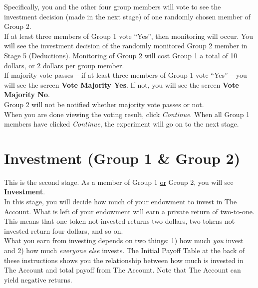 \documentclass[12pt]{article}
\begin{document}
Specifically, you and the other four group members will vote to see the investment decision (made in the next stage) of one randomly chosen member of Group 2.\\ 
 
If at least three members of Group 1 vote ``Yes'', then monitoring will occur.  You will see the investment decision of the randomly monitored Group 2 member in Stage 5 (Deductions).  Monitoring of Group 2 will cost Group 1 a total of 10 dollars, or 2 dollars per group member.\\ 
 
If majority vote passes -- if at least three members of Group 1 vote ``Yes'' -- you will see the screen {\bf Vote Majority Yes}.  If not, you will see the screen {\bf Vote Majority No}.\\ 

Group 2 will not be notified whether majority vote passes or not.\\ 

When you are done viewing the voting result, click {\em Continue}. When all Group 1 members have clicked {\em Continue}, the experiment will go on to the next stage.\\ 

\newpage

\fi




\section{Investment (Group 1 \& Group 2)}

This is the second stage. As a member of Group 1 \underline{or} Group 2, you will see {\bf Investment}.\\

In this stage, you will decide how much of your endowment to invest in The Account. What is left of your endowment will earn a private return of two-to-one. This means that one token not invested returns two dollars, two tokens not invested return four dollars, and so on.\\ 

What you earn from investing depends on two things: 1) how much {\em you} invest and 2) how much {\em everyone else} invests.  The Initial Payoff Table at the back of these instructions shows you the relationship between how much is invested in The Account and total payoff from The Account. Note that The Account can yield negative returns.\\ 
\end{document}
